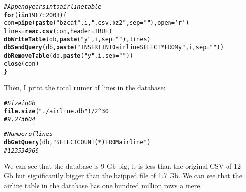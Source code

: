 \documentclass{llncs}\usepackage[]{graphicx}\usepackage[]{color}
\makeatletter
\newcommand{\hlnum}[1]{\textcolor[rgb]{0.686,0.059,0.569}{#1}}%
\newcommand{\hlstr}[1]{\textcolor[rgb]{0.192,0.494,0.8}{#1}}%
\newcommand{\hlcom}[1]{\textcolor[rgb]{0.678,0.584,0.686}{\textit{#1}}}%
\newcommand{\hlopt}[1]{\textcolor[rgb]{0,0,0}{#1}}%
\newcommand{\hlstd}[1]{\textcolor[rgb]{0.345,0.345,0.345}{#1}}%
\newcommand{\hlkwa}[1]{\textcolor[rgb]{0.161,0.373,0.58}{\textbf{#1}}}%
\newcommand{\hlkwb}[1]{\textcolor[rgb]{0.69,0.353,0.396}{#1}}%
\newcommand{\hlkwc}[1]{\textcolor[rgb]{0.333,0.667,0.333}{#1}}%
\newcommand{\hlkwd}[1]{\textcolor[rgb]{0.737,0.353,0.396}{\textbf{#1}}}%
\newenvironment{kframe}{%
 \def\at@end@of@kframe{}%
 \ifinner\ifhmode%
  \def\at@end@of@kframe{\end{minipage}}%
  \begin{minipage}{\columnwidth}%
 \fi\fi%
 \def\FrameCommand##1{\hskip\@totalleftmargin \hskip-\fboxsep
 \colorbox{shadecolor}{##1}\hskip-\fboxsep
     \hskip-\linewidth \hskip-\@totalleftmargin \hskip\columnwidth}%
 \MakeFramed {\advance\hsize-\width
   \@totalleftmargin\z@ \linewidth\hsize
   \@setminipage}}%
 {\par\unskip\endMakeFramed%
 \at@end@of@kframe}
\newenvironment{knitrout}{}{} %
\makeatother
\begin{document}
\begin{knitrout}
\color{fgcolor}\begin{kframe}
\begin{alltt}
\hlcom{# Append years into airline table}
\hlkwa{for} \hlstd{(i} \hlkwa{in} \hlnum{1987}\hlopt{:}\hlnum{2008}\hlstd{)\{}
  \hlstd{con}\hlkwb{=}\hlkwd{pipe}\hlstd{(}\hlkwd{paste}\hlstd{(}\hlstr{"bzcat "}\hlstd{,i,}\hlstr{".csv.bz2"}\hlstd{,}\hlkwc{sep}\hlstd{=}\hlstr{""}\hlstd{),} \hlkwc{open} \hlstd{=} \hlstr{'r'}\hlstd{)}
  \hlstd{lines} \hlkwb{=} \hlkwd{read.csv}\hlstd{(con,} \hlkwc{header} \hlstd{=} \hlnum{TRUE}\hlstd{)}
  \hlkwd{dbWriteTable}\hlstd{(db,} \hlkwd{paste}\hlstd{(}\hlstr{"y"}\hlstd{,i,}\hlkwc{sep}\hlstd{=}\hlstr{""}\hlstd{),lines)}
  \hlkwd{dbSendQuery}\hlstd{(db,}\hlkwd{paste}\hlstd{(}\hlstr{"INSERT INTO airline SELECT * FROM y"}\hlstd{,i,}\hlkwc{sep}\hlstd{=}\hlstr{""}\hlstd{))}
  \hlkwd{dbRemoveTable}\hlstd{(db,}\hlkwd{paste}\hlstd{(}\hlstr{"y"}\hlstd{,i,}\hlkwc{sep}\hlstd{=}\hlstr{""}\hlstd{))}
  \hlkwd{close}\hlstd{(con)}
\hlstd{\}}
\end{alltt}
\end{kframe}
\end{knitrout}
Then, I print the total numer of lines in the database:
\begin{knitrout}
\color{fgcolor}\begin{kframe}
\begin{alltt}
\hlcom{# Size in Gb}
\hlkwd{file.size}\hlstd{(}\hlstr{"./airline.db"}\hlstd{)}\hlopt{/}\hlnum{2}\hlopt{^}\hlnum{30}
\hlcom{# 9.273604}

\hlcom{# Number of lines}
\hlkwd{dbGetQuery}\hlstd{(db,} \hlstr{"SELECT COUNT(*) FROM airline"}\hlstd{)}
\hlcom{# 123534969}
\end{alltt}
\end{kframe}
\end{knitrout}
We can see that the database is 9 Gb big, it is less than the original CSV of 12 Gb but significantly bigger than the bzipped file of 1.7 Gb. We can see that the airline table in the database has one hundred million rows a mere.

\end{document}
